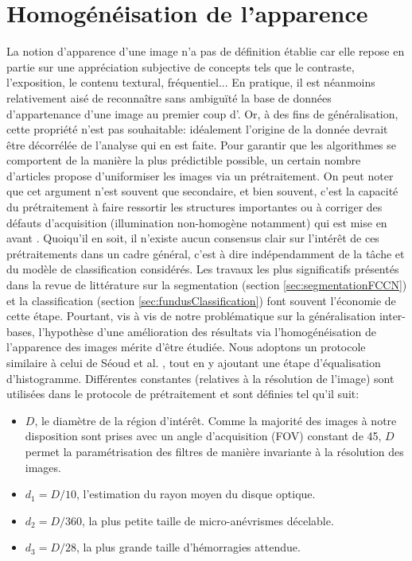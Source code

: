 
\section{Homogénéisation de l'apparence}
\label{an:PrétraitementDonnées}
La notion d'apparence d'une image n'a pas de définition établie car elle repose en partie sur une appréciation subjective de concepts tels que le contraste, l'exposition, le contenu textural, fréquentiel... En pratique, il est néanmoins relativement aisé de reconnaître sans ambiguïté la base de données d'appartenance d'une image au premier coup d'\oeil. Or, à des fins de généralisation, cette propriété n'est pas souhaitable: idéalement l'origine de la donnée devrait être décorrélée de l'analyse qui en est faite. Pour garantir que les algorithmes se comportent de la manière la plus prédictible possible, un certain nombre d'articles propose d'uniformiser les images via un prétraitement. On peut noter que cet argument n'est souvent que secondaire, et bien souvent, c'est la capacité du prétraitement à faire ressortir les structures importantes ou à corriger des défauts d'acquisition (illumination non-homogène notamment) qui est mise en avant \cite{joshiReviewPreprocessingTechniques2017, mukherjeeSearchOptimalPreprocessing2021}. Quoiqu'il en soit, il n'existe aucun consensus clair sur l'intérêt de ces prétraitements dans un cadre général, c'est à dire indépendamment de la tâche et du modèle de classification considérés. Les travaux les plus significatifs présentés dans la revue de littérature sur la segmentation (section \ref{sec:segmentationFCCN}) et la classification (section \ref{sec:fundusClassification}) font souvent l'économie de cette étape. Pourtant, vis à vis de notre problématique sur la généralisation inter-bases, l'hypothèse d'une amélioration des résultats via l'homogénéisation de l'apparence des images mérite d'être étudiée. Nous adoptons un protocole similaire à celui de Séoud et al. \cite{seoudRedLesionDetection2016}, tout en y ajoutant une étape d'équalisation d'histogramme.
Différentes constantes (relatives à la résolution de l'image) sont utilisées dans le protocole de prétraitement et sont définies tel qu'il suit:
\begin{itemize}
	\item $D$, le diamètre de la région d'intérêt. Comme la majorité des images à notre disposition sont prises avec un angle d'acquisition (\ac{FOV}) constant de 45\degree,  $D$ permet la paramétrisation des filtres de manière invariante à la résolution des images.
	\item $d_1 = D / 10$, l'estimation du rayon moyen du disque optique.
	\item $d_2 = D /360 $, la plus petite taille de micro-anévrismes décelable.
	\item $d_3 = D / 28$, la plus grande taille d'hémorragies attendue.
\end{itemize}


